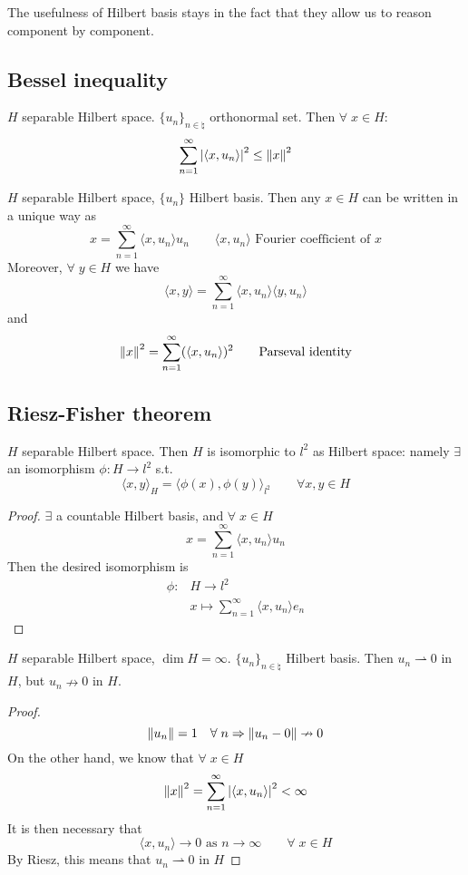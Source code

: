 The usefulness of Hilbert basis stays in the fact that they allow us to reason component by component.
\subsection{Bessel inequality}
\begin{theorem}
    \(H\) separable Hilbert space. \(\{u_n\}_{n \in \natural}\) orthonormal set. Then \(\forall \; x \in H\):
    \[
        \sum_{n=1}^\infty \abs{\langle x, u_n\rangle }^2 \leq \norm{x}^2
    \]
\end{theorem}
\begin{theorem}
    \(H\) separable Hilbert space, \(\{u_n\}\) Hilbert basis.
    Then any \(x \in H\) can be written in a unique way as 
    \[
        x = \sum_{n=1}^\infty \langle x, u_n\rangle   u_n \qquad \langle x, u_n\rangle   \text{ Fourier coefficient of }x
    \]
    Moreover, \(\forall\; y \in H\) we have
    \[
        \langle x, y\rangle   = \sum_{n=1}^\infty \langle x, u_n\rangle   \langle y, u_n \rangle  
    \]
    and 
    \[
        \norm{x}^2 = \sum_{n=1}^\infty (\langle x, u_n\rangle  )^2 \tag*{Parseval identity}
    \]
\end{theorem}
\subsection{Riesz-Fisher theorem}
\begin{theorem}
    \(H\) separable Hilbert space. Then \(H\) is isomorphic to \(l^2\) as Hilbert space: namely \(\exists\) an isomorphism \(\phi: H \to l^2\) s.t.
    \[
        \langle x, y\rangle  _H = \langle \phi(x), \phi(y)\rangle  _{l^2} \qquad \forall x, y \in H
    \]
\end{theorem}
\begin{proof}
    \(\exists\) a countable Hilbert basis, and \(\forall\; x \in H\)
    \[
        x = \sum_{n=1}^\infty \langle x, u_n\rangle   u_n
    \]
    Then the desired isomorphism is
    \[
        \begin{array}{rl}
            \phi: & H \to l^2 \\
            & x \mapsto \sum_{n=1}^\infty \langle x, u_n\rangle   e_n
        \end{array}
    \]
\end{proof}

\begin{corollary}
    \(H\) separable Hilbert space, \(\dim H = \infty\). \(\{u_n\}_{n \in \natural}\) Hilbert basis. Then \(u_n \rightharpoonup 0\)  in \(H\), but \(u_n \nrightarrow 0\) in \(H\).
\end{corollary}
\begin{proof}
    \[
        \norm{u_n}=1 \quad \forall\; n \Rightarrow \norm{u_n -0} \nrightarrow 0 
    \]
    On the other hand, we know that \(\forall \; x \in H\)
    \[
        \norm{x}^2 = \sum_{n=1}^\infty \abs{\langle x, u_n\rangle  }^2 < \infty
    \]
    It is then necessary that
    \[
        \langle x, u_n\rangle   \to 0 \text{ as } n \to \infty \qquad \forall\; x \in H
    \]
    By Riesz, this means that \(u_n \rightharpoonup 0\) in \(H\)
\end{proof}

